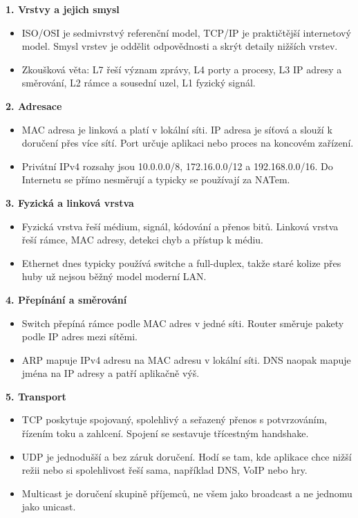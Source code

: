 \documentclass[11pt,a4paper]{article}
\begin{document}
\textbf{1. Vrstvy a jejich smysl}
\begin{itemize}
  \item ISO/OSI je sedmivrstvý referenční model, TCP/IP je praktičtější internetový model. Smysl vrstev je oddělit odpovědnosti a skrýt detaily nižších vrstev.
  \item Zkoušková věta: L7 řeší význam zprávy, L4 porty a procesy, L3 IP adresy a směrování, L2 rámce a sousední uzel, L1 fyzický signál.
\end{itemize}

\textbf{2. Adresace}
\begin{itemize}
  \item MAC adresa je linková a platí v lokální síti. IP adresa je síťová a slouží k doručení přes více sítí. Port určuje aplikaci nebo proces na koncovém zařízení.
  \item Privátní IPv4 rozsahy jsou 10.0.0.0/8, 172.16.0.0/12 a 192.168.0.0/16. Do Internetu se přímo nesměrují a typicky se používají za NATem.
\end{itemize}

\textbf{3. Fyzická a linková vrstva}
\begin{itemize}
  \item Fyzická vrstva řeší médium, signál, kódování a přenos bitů. Linková vrstva řeší rámce, MAC adresy, detekci chyb a přístup k médiu.
  \item Ethernet dnes typicky používá switche a full-duplex, takže staré kolize přes huby už nejsou běžný model moderní LAN.
\end{itemize}

\textbf{4. Přepínání a směrování}
\begin{itemize}
  \item Switch přepíná rámce podle MAC adres v jedné síti. Router směruje pakety podle IP adres mezi sítěmi.
  \item ARP mapuje IPv4 adresu na MAC adresu v lokální síti. DNS naopak mapuje jména na IP adresy a patří aplikačně výš.
\end{itemize}

\textbf{5. Transport}
\begin{itemize}
  \item TCP poskytuje spojovaný, spolehlivý a seřazený přenos s potvrzováním, řízením toku a zahlcení. Spojení se sestavuje třícestným handshake.
  \item UDP je jednodušší a bez záruk doručení. Hodí se tam, kde aplikace chce nižší režii nebo si spolehlivost řeší sama, například DNS, VoIP nebo hry.
  \item Multicast je doručení skupině příjemců, ne všem jako broadcast a ne jednomu jako unicast.
\end{itemize}
\end{document}
